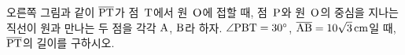 \noindent\begin{minipage}[t]{0.58\linewidth}\vspace{0pt}\raggedright 오른쪽 그림과 같이 $\overline{\mathrm{PT}}$가 점~$\mathrm{T}$에서 원~$\mathrm{O}$에 접할 때, 점~$\mathrm{P}$와 원~$\mathrm{O}$의 중심을 지나는 직선이 원과 만나는 두 점을 각각 $\mathrm{A}$, $\mathrm{B}$라 하자. $\angle\mathrm{PBT}=30^\circ$, $\overline{\mathrm{AB}}=10\sqrt{3}\,\mathrm{cm}$일 때, $\overline{\mathrm{PT}}$의 길이를 구하시오.\end{minipage}\hfill\begin{minipage}[t]{0.4\linewidth}\vspace{0pt}\centering \resizebox{\ifdim\width>\linewidth\linewidth\else\width\fi}{!}{}\end{minipage}\par
